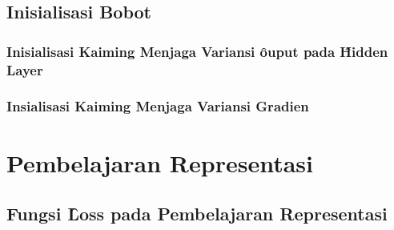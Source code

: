     \subsection{Inisialisasi Bobot}
        \subsubsection{Inisialisasi Kaiming Menjaga Variansi \f{ouput} pada \f{Hidden Layer}}

        \subsubsection{Insialisasi Kaiming Menjaga Variansi Gradien}



\section{Pembelajaran Representasi}

    \subsection{Fungsi \f{Loss} pada Pembelajaran Representasi}













        

